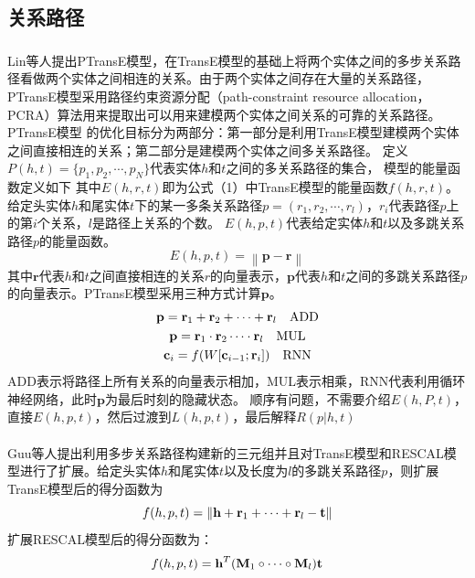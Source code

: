 \documentclass[twocolumn]{article}
\newcommand{\upcite}[1]{\textsuperscript{\textsuperscript{\cite{#1}}}}
\begin{document}
\subsection{关系路径}


Lin等人\upcite{PTransE}提出PTransE模型，在TransE模型的基础上将两个实体之间的多步关系路径看做两个实体之间相连的关系。由于两个实体之间存在大量的关系路径，PTransE模型采用路径约束资源分配（path-constraint resource allocation，PCRA）算法用来提取出可以用来建模两个实体之间关系的可靠的关系路径。PTransE模型
的优化目标分为两部分：第一部分是利用TransE模型建模两个实体之间直接相连的关系；第二部分是建模两个实体之间多关系路径。
定义$P(h,t)=\{p_1,p_2,\cdots,p_N\}$代表实体$h$和$t$之间的多关系路径的集合，
模型的能量函数定义如下
其中$E(h,r,t)$即为公式（1）中TransE模型的能量函数$f(h,r,t)$。
给定头实体$h$和尾实体$t$下的某一多条关系路径$p=(r_1,r_2,\cdots,r_l)$，$r_i$代表路径$p$上的第$i$个关系，$l$是路径上关系的个数。
$E(h,p,t)$代表给定实体$h$和$t$以及多跳关系路径$p$的能量函数。
\begin{equation}
	E(h,p,t)=\left \| \textbf{p}-\textbf{r} \right \|
\end{equation}
其中$\textbf{r}$代表$h$和$t$之间直接相连的关系$r$的向量表示，$\textbf{p}$代表$h$和$t$之间的多跳关系路径$p$的向量表示。PTransE模型采用三种方式计算$\textbf{p}$。
\begin{gather}
	\textbf{p}=\textbf{r}_1+\textbf{r}_2+\cdots+\textbf{r}_l \quad \text{ADD}\notag \\
	\textbf{p}=\textbf{r}_1\cdot\textbf{r}_2\cdots\cdot\textbf{r}_l \quad \text{MUL}\notag \\
	\textbf{c}_i=f(W[\textbf{c}_{i-1};\textbf{r}_i]) \quad \text{RNN} \notag
\end{gather}
ADD表示将路径上所有关系的向量表示相加，MUL表示相乘，RNN代表利用循环神经网络，此时$\textbf{p}$为最后时刻的隐藏状态。
顺序有问题，不需要介绍$E(h,P,t)$，直接$E(h,p,t)$，然后过渡到$L(h,p,t)$，最后解释$R(p|h,t)$

Guu等人\upcite{Guu}提出利用多步关系路径构建新的三元组并且对TransE模型和RESCAL模型进行了扩展。给定头实体$h$和尾实体$t$以及长度为$l$的多跳关系路径$p$，则扩展TransE模型后的得分函数为
\begin{equation}
	f(h,p,t)=\left \| \textbf{h}+\textbf{r}_1+\cdots+\textbf{r}_l-\textbf{t} \right \| \notag
\end{equation}
扩展RESCAL模型后的得分函数为：
\begin{equation}
	f(h,p,t)=\textbf{h}^T(\textbf{M}_1\circ\cdots\circ\textbf{M}_l)\textbf{t} \notag
\end{equation}
\end{document}
